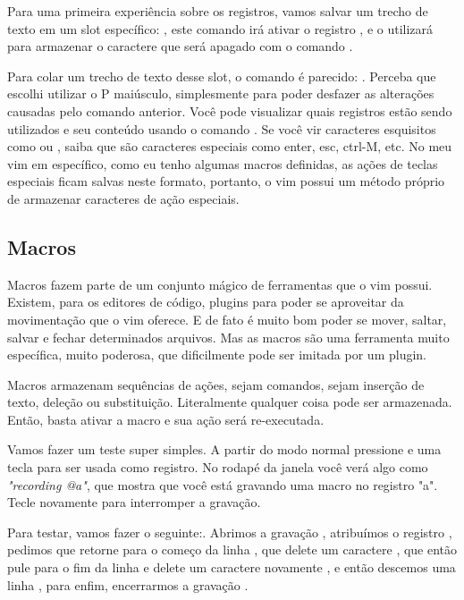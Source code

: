 \documentclass[a4paper, 12pt]{article}
\begin{document}
Para uma primeira experiência sobre os registros, vamos salvar um trecho de texto
em um slot específico: , este comando irá ativar o registro , e
o utilizará para armazenar o caractere que será apagado com o comando .

Para colar um trecho de texto desse slot, o comando é parecido: .
Perceba que escolhi utilizar o P maiúsculo, simplesmente para poder desfazer as alterações causadas pelo comando anterior.
Você pode visualizar quais registros estão sendo utilizados e seu conteúdo usando o comando .
Se você vir caracteres esquisitos como  ou \vimkeys{\^}, saiba que são caracteres especiais como 
enter, esc, ctrl-M, etc.
No meu vim em específico, como eu tenho algumas macros definidas, as ações de teclas especiais ficam salvas neste formato,
portanto, o vim possui um método próprio de armazenar caracteres de ação especiais.

\subsection{Macros}
Macros fazem parte de um conjunto mágico de ferramentas que o vim possui.
Existem, para os editores de código, plugins para poder se aproveitar da movimentação que o vim oferece.
E de fato é muito bom poder se mover, saltar, salvar e fechar determinados arquivos.
Mas as macros são uma ferramenta muito específica, muito poderosa, que dificilmente pode ser imitada por um plugin.

Macros armazenam sequências de ações, sejam comandos, sejam inserção de texto, deleção ou substituição.
Literalmente qualquer coisa pode ser armazenada. Então, basta ativar a macro e sua ação será re-executada.

Vamos fazer um teste super simples.
A partir do modo normal pressione  e uma tecla para ser usada como registro.
No rodapé da janela você verá algo como \textit{"recording @a"}, que mostra que você está gravando
uma macro no registro "a".
Tecle novamente  para interromper a gravação.

Para testar, vamos fazer o seguinte:.
Abrimos a gravação , atribuímos o registro ,
pedimos que retorne para o começo da linha , que delete um caractere
, que então pule para o fim da linha \vimcommand{\$}
e delete um caractere novamente , e então descemos uma linha ,
para enfim, encerrarmos a gravação .
\end{document}
